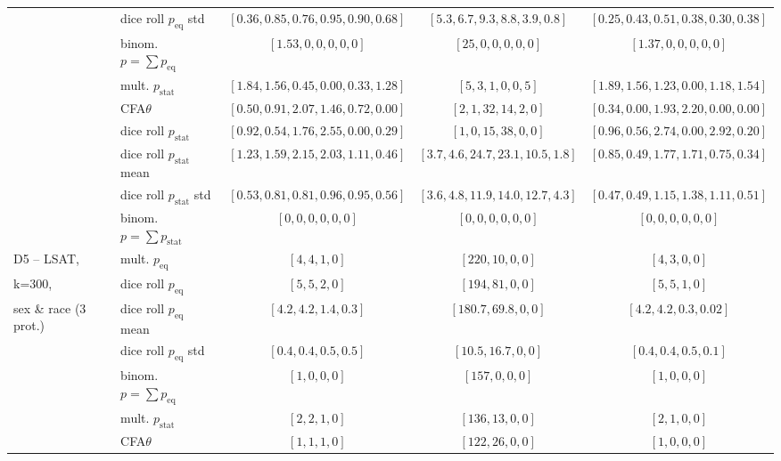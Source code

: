 \begin{table}[t!]
{\begin{tabular}{llccc}
									& dice roll $p_{\text{eq}}$ std	& $[0.36, 0.85, 0.76, 0.95, 0.90, 0.68]$ & $[5.3, 6.7, 9.3, 8.8, 3.9, 0.8]$ 	& $[0.25, 0.43, 0.51, 0.38, 0.30, 0.38]$ \\
								& binom. \algoFAIR $p = \sum p_{\text{eq}}$	& $[1.53,0,0, 0,0,0]$		& $[25,0,0, 0,0,0]$		& $[1.37,0,0, 0,0,0]$  \\
									\cline{2-5}
									& mult. \algoFAIR $p_{\text{stat}}$ & $[1.84, 1.56, 0.45, 0.00, 0.33, 1.28]$ & $[5, 3, 1, 0, 0, 5]$ & $[1.89, 1.56, 1.23, 0.00, 1.18, 1.54]$  \\
									& CFA$\theta$ &  $[0.50, 0.91, 2.07, 1.46, 0.72, 0.00]$ & $[2, 1, 32, 14, 2, 0]$ & $[0.34, 0.00, 1.93, 2.20, 0.00, 0.00]$ \\
									& dice roll $p_{\text{stat}}$ 	& $[0.92, 0.54, 1.76, 2.55, 0.00, 0.29]$ & $[1, 0, 15, 38, 0, 0]$ 		& $[0.96, 0.56, 2.74, 0.00, 2.92, 0.20]$ \\
									& dice roll $p_{\text{stat}}$ mean	& $[1.23, 1.59, 2.15, 2.03, 1.11, 0.46]$ & $[3.7, 4.6, 24.7, 23.1, 10.5, 1.8]$ 		& $[0.85, 0.49, 1.77, 1.71, 0.75, 0.34]$ \\
									& dice roll $p_{\text{stat}}$ std	& $[0.53, 0.81, 0.81, 0.96, 0.95, 0.56]$ & $[3.6, 4.8, 11.9, 14.0, 12.7, 4.3]$ 		& $[0.47, 0.49, 1.15, 1.38, 1.11, 0.51]$ \\
								& binom. \algoFAIR $p = \sum p_{\text{stat}}$	& $[0,0,0, 0,0,0]$		& $[0,0,0, 0,0,0]$	& $[0,0,0, 0,0,0]$ 	 \\	
			\midrule
			\midrule
			D5 -- LSAT, 			& mult. \algoFAIR $p_{\text{eq}}$ 	& $[4, 4, 1, 0]$	& $[220, 10, 0, 0]$ & $[4, 3, 0, 0]$  \\
			k=300, 					& dice roll $p_{\text{eq}}$ 	& $[5, 5, 2, 0]$ & $[194, 81, 0, 0]$ 	& $[5, 5, 1, 0]$ \\
			sex \& race (3 prot.)	& dice roll $p_{\text{eq}}$ mean 	& $[4.2, 4.2, 1.4, 0.3]$ & $[180.7, 69.8, 0, 0]$ 	& $[4.2, 4.2, 0.3, 0.02]$ \\
									& dice roll $p_{\text{eq}}$ std	& $[0.4, 0.4, 0.5, 0.5]$ & $[10.5, 16.7, 0, 0]$ 	& $[0.4, 0.4, 0.5, 0.1]$ \\
								& binom. \algoFAIR $p = \sum p_{\text{eq}}$	& $[1,0,0, 0]$		& $[157,0,0, 0]$		& $[1,0,0, 0]$  \\
									\cline{2-5}
								 	& mult. \algoFAIR $p_{\text{stat}}$ 	& $[2, 2, 1, 0]$ 	& $[136, 13, 0, 0]$ & $[2, 1, 0, 0]$  \\
									& CFA$\theta$ 					& $[1, 1, 1, 0]$ 	& $[122, 26, 0, 0]$ & $[1, 0, 0, 0]$  \\

\end{tabular}}
\end{table}
